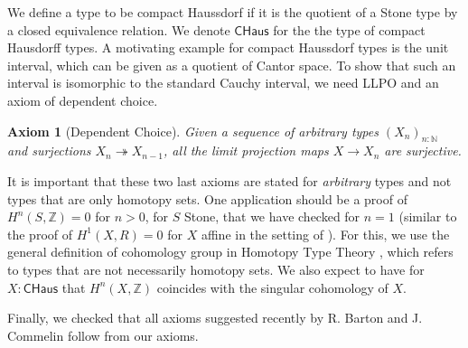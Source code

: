 \documentclass[letterpaper]{../../util/easychair}
\newtheorem{axiom}{Axiom}
\newcommand{\N}{\mathbb{N}}
\newcommand{\CHaus}{\mathsf{CHaus}}
\newcommand{\Noo}{\N_{\infty}}
\newcommand{\ints}{\mathbb{Z}}
\begin{document}
We define a type to be compact Haussdorf if it is the quotient of a Stone type by a closed equivalence relation. 
We denote $\CHaus$ for the the type of compact Hausdorff types. 
A motivating example for compact Haussdorf types is the unit interval, which can be given as a quotient of Cantor space. 
To show that such an interval is isomorphic to the standard Cauchy interval, 
we need LLPO and an axiom of dependent choice. 
\begin{axiom}[Dependent Choice]
  Given a sequence of arbitrary types $(X_n)_{n:\mathbb N}$ and surjections $X_n \twoheadrightarrow X_{n-1}$, 
  all the limit projection maps $X \to X_n$ are surjective. 
\end{axiom}


It is important that these two last axioms are stated for {\em arbitrary} types and not types that are only
homotopy sets. One application should be a proof of $H^n(S,\ints) = 0$ for $n>0$, for $S$ Stone,
that we have checked for $n = 1$ (similar to the proof of $H^1(X,R) = 0$ for $X$ affine in the setting of \cite{draft}).
For this, we use the general definition of cohomology group in Homotopy Type Theory \cite{hott}, which refers to
types that are not necessarily homotopy sets.
We also expect to have for $X:\CHaus$ that $H^n(X,\ints)$ coincides with the singular cohomology of $X$.

 Finally, we checked that all axioms suggested recently by R. Barton and J. Commelin \cite{bc24} follow from our axioms.



%
%





\printbibliography
\end{document}
